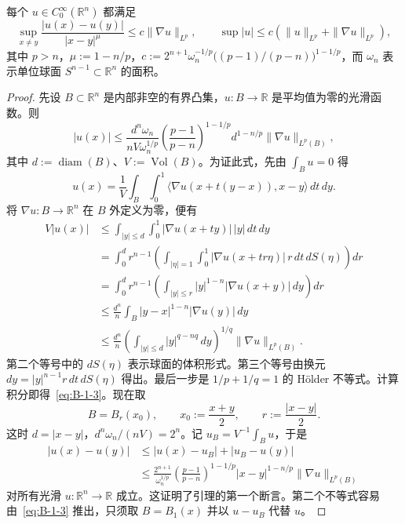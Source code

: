 \begin{lemma}\label{lem:B-1-16}
每个 $u\in C_0^\infty(\mathbb R^n)$ 都满足
\[
\sup_{x\ne y}\frac{|u(x)-u(y)|}{|x-y|^\mu}\le c\|\nabla u\|_{L^p},
\qquad\sup|u|\le c(\|u\|_{L^p}+\|\nabla u\|_{L^p}),
\]
其中 $p>n$，$\mu:=1-n/p$，$c:=2^{n+1}\omega_n^{-1/p}\bigl((p-1)/(p-n)\bigr)^{1-1/p}$，而 $\omega_n$ 表示单位球面 $S^{n-1}\subset\mathbb R^n$ 的面积。
\end{lemma}
\begin{proof}
先设 $B\subset\mathbb R^n$ 是内部非空的有界凸集，$u:B\to\mathbb R$ 是平均值为零的光滑函数。则
\begin{equation}\label{eq:B-1-3}
|u(x)|\le\frac{d^n\omega_n}{nV\omega_n^{1/p}}
\left(\frac{p-1}{p-n}\right)^{1-1/p}
d^{1-n/p}\|\nabla u\|_{L^p(B)},
\end{equation}
其中 $d:=\operatorname{diam}(B)$、$V:=\operatorname{Vol}(B)$。为证此式，先由 $\int_Bu=0$ 得
\[
u(x)=\frac1V\int_B\int_0^1
\langle\nabla u(x+t(y-x)),x-y\rangle\,dt\,dy.
\]
将 $\nabla u:B\to\mathbb R^n$ 在 $B$ 外定义为零，便有
\begin{align*}
V|u(x)|
&\le\int_{|y|\le d}\int_0^1|\nabla u(x+ty)|\,|y|\,dt\,dy\\
&=\int_0^d r^{n-1}\left(\int_{|\eta|=1}\int_0^1
|\nabla u(x+tr\eta)|\,r\,dt\,dS(\eta)\right)dr\\
&=\int_0^d r^{n-1}\left(\int_{|y|\le r}|y|^{1-n}|\nabla u(x+y)|\,dy\right)dr\\
&\le\frac{d^n}{n}\int_B|y-x|^{1-n}|\nabla u(y)|\,dy\\
&\le\frac{d^n}{n}\left(\int_{|y|\le d}|y|^{q-nq}\,dy\right)^{1/q}
\|\nabla u\|_{L^p(B)}.
\end{align*}
第二个等号中的 $dS(\eta)$ 表示球面的体积形式。第三个等号由换元 $dy=|y|^{n-1}r\,dt\,dS(\eta)$ 得出。最后一步是 $1/p+1/q=1$ 的 Hölder 不等式。计算积分即得~\eqref{eq:B-1-3}。现在取
\[
B=B_r(x_0),\qquad x_0:=\frac{x+y}{2},\qquad r:=\frac{|x-y|}{2}.
\]
这时 $d=|x-y|$，$d^n\omega_n/(nV)=2^n$。记 $u_B=V^{-1}\int_Bu$，于是
\begin{align*}
|u(x)-u(y)|
&\le|u(x)-u_B|+|u_B-u(y)|\\
&\le\frac{2^{n+1}}{\omega_n^{1/p}}
\left(\frac{p-1}{p-n}\right)^{1-1/p}
|x-y|^{1-n/p}\|\nabla u\|_{L^p(B)}
\end{align*}
对所有光滑 $u:\mathbb R^n\to\mathbb R$ 成立。这证明了引理的第一个断言。第二个不等式容易由~\eqref{eq:B-1-3} 推出，只须取 $B=B_1(x)$ 并以 $u-u_B$ 代替 $u$。
\end{proof}

